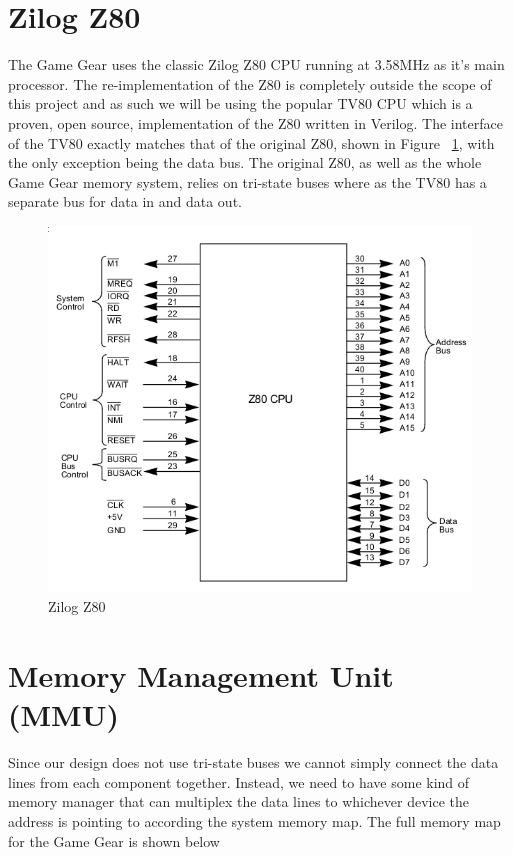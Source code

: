 \documentclass{article}
\begin{document}
\section{Zilog Z80}
The Game Gear uses the classic Zilog Z80 CPU running at 3.58MHz 
as it's main processor.
The re-implementation of the Z80 is completely outside the scope of
this project and as such we will be using the popular TV80 \cite{tv80}
CPU which is a proven, open source, implementation of the Z80
written in Verilog. The interface of the TV80 exactly matches that of
the original Z80, shown in Figure ~\ref{fig:z80}, with the only
exception being the data bus. The original Z80, as well as the whole
Game Gear memory system, relies on tri-state buses where as the TV80 has
a separate bus for data in and data out. 

\begin{figure}[H]
\centering
\includegraphics[scale=0.4]{z80.png}
\caption{Zilog Z80}
\label{fig:z80}
\end{figure}

\section{Memory Management Unit (MMU)}
Since our design does not use tri-state buses we cannot simply
connect the data lines from each component together. Instead, we
need to have some kind of memory manager that can multiplex the data
lines to whichever device the address is pointing to according the
system memory map. The full memory map for the Game Gear is shown below
\end{document}
